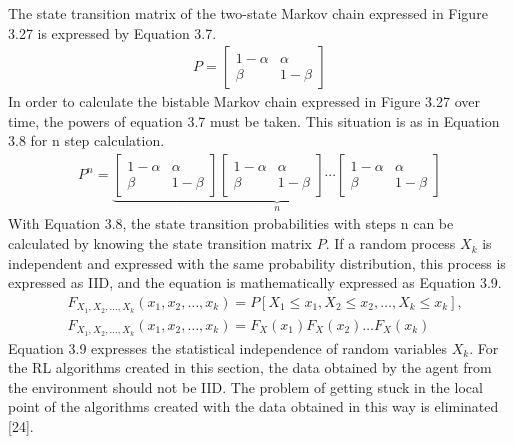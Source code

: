 \documentclass[12pt,twoside,a4]{mwbk}
\begin{document}
\noindent The state transition matrix of the two-state Markov chain expressed in Figure 3.27 is expressed by Equation 3.7.
\begin{subequations}
\begin{align}
        P=\left[\begin{array}{cc}
        1-\alpha & \alpha \\
        \beta & 1-\beta
        \end{array}\right]
\end{align}
\end{subequations}
In order to calculate the bistable Markov chain expressed in Figure 3.27 over time, the powers of equation 3.7 must be taken. This situation is as in Equation 3.8 for n step calculation.
\begin{subequations}
\begin{align}
        P^{n}=\underbrace{\left[\begin{array}{cc}
        1-\alpha & \alpha \\
        \beta & 1-\beta
        \end{array}\right]\left[\begin{array}{cc}
        1-\alpha & \alpha \\
        \beta & 1-\beta
        \end{array}\right] \cdots\left[\begin{array}{cc}
        1-\alpha & \alpha \\
        \beta & 1-\beta
        \end{array}\right]}_{n}
\end{align}
\end{subequations}
With Equation 3.8, the state transition probabilities with steps $\mathrm{n}$ can be calculated by knowing the state transition matrix $P$. If a random process $X_{k}$ is independent and expressed with the same probability distribution, this process is expressed as IID, and the equation is mathematically expressed as Equation 3.9.
\begin{subequations}
\begin{align}
        &F_{X_{1}, X_{2}, \ldots, X_{k}}\left(x_{1}, x_{2}, \ldots, x_{k}\right)=P\left[X_{1} \leq x_{1}, X_{2} \leq x_{2}, \ldots, X_{k} \leq x_{k}\right], \\
        &F_{X_{1}, X_{2}, \ldots, X_{k}}\left(x_{1}, x_{2}, \ldots, x_{k}\right)=F_{X}\left(x_{1}\right) F_{X}\left(x_{2}\right) \ldots F_{X}\left(x_{k}\right)
\end{align}
\end{subequations}
Equation 3.9 expresses the statistical independence of random variables $X_{k}$. For the RL algorithms created in this section, the data obtained by the agent from the environment should not be IID. The problem of getting stuck in the local point of the algorithms created with the data obtained in this way is eliminated [24].
\end{document}
